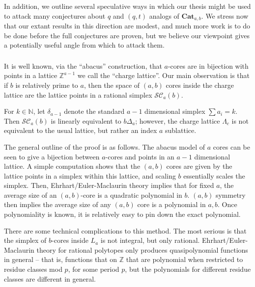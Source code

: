 \documentclass{amsart}[12pt]
\theoremstyle{definition}
\newcommand{\Z}{\mathbb{Z}}
\newcommand{\N}{\mathbb{N}}
\newcommand{\SC}{\mathcal{SC}}
\newcommand{\Cat}{\mathbf{Cat}}
\begin{document}
In addition, we outline several speculative ways in which our thesis might be used to attack many conjectures about $q$ and $(q,t)$ analogs of $\Cat_{a,b}$.  We stress now that our extant results in this direction are modest, and much more work is to do be done before the full conjectures are proven, but we believe our viewpoint gives a potentially useful angle from which to attack them.

\subsubsection{}




It is well known, via the ``abacus'' construction, that $a$-cores are
in bijection with points in a lattice $\Z^{a-1}$ we call the
``charge lattice''.  Our main observation is that if $b$ is relatively
prime to $a$, then the space of $(a,b)$ cores inside the charge
lattice are the lattice points in a rational simplex $\SC_a(b)$.

For $k\in\N$, let $\delta_{a-1}$ denote the
standard $a-1$ dimensional simplex $\sum a_i=k$.  Then $\SC_a(b)$ is
linearly equivalent to $b\Delta_a$; however, the charge lattice
$\Lambda_c$ is not equivalent to the usual lattice, but rather an
index $a$ sublattice.




The general outline of the proof is as follows.  The abacus model of
$a$ cores can be seen to give a bijection between $a$-cores and points
in an $a-1$ dimensional lattice.   A simple computation shows
that the $(a,b)$ cores are given by the lattice points in a simplex
within this lattice, and scaling $b$ essentially scales the simplex.
Then, Ehrhart/Euler-Maclaurin theory implies that for fixed $a$, the
average size of an $(a,b)$-core is a quadratic polynomial in $b$.
$(a, b)$ symmetry then implies the average size of any $(a,b)$ core is
a polynomial in $a, b$.  Once polynomiality is known, it is relatively
easy to pin down the exact polynomial.

There are some technical complications to this method.  The most serious is that the simplex of $b$-cores inside $L_a$ is not integral,
but only rational.  Ehrhart/Euler-Maclaurin theory for
rational polytopes only produces quasipolynomial functions in general -- that
is, functions that on $\Z$ that are polynomial when restricted to
residue classes mod $p$, for some period $p$, but the polynomials for different residue classes are different in general.
\end{document}

